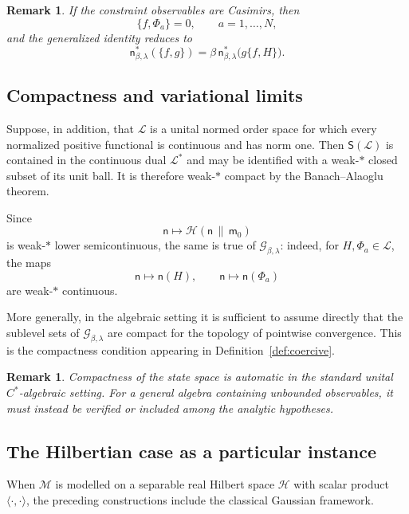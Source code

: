 \documentclass[11pt,reqno]{amsart}
\newtheorem{rem}[Theorem]{Remark}
\begin{document}
\begin{rem}
If the constraint observables are Casimirs, then
\[
\{f,\Phi_a\}=0,
\qquad
a=1,\ldots,N,
\]
and the generalized identity reduces to
\[
\mathsf n_{\beta,\lambda}^*(\{f,g\})
=
\beta\,
\mathsf n_{\beta,\lambda}^*
\bigl(g\{f,H\}\bigr).
\]
\end{rem}

\subsection{Compactness and variational limits}

Suppose, in addition, that $\mathcal L$ is a unital normed order space
for which every normalized positive functional is continuous and has
norm one. Then $\mathsf S(\mathcal L)$ is contained in the continuous
dual $\mathcal L^*$ and may be identified with a weak-$*$ closed subset
of its unit ball. It is therefore weak-$*$ compact by the
Banach--Alaoglu theorem.

Since
\[
\mathsf n\longmapsto
\mathcal H(\mathsf n\,\|\,\mathsf m_0)
\]
is weak-$*$ lower semicontinuous, the same is true of
$\mathcal G_{\beta,\lambda}$: indeed, for
$H,\Phi_a\in\mathcal L$, the maps
\[
\mathsf n\longmapsto\mathsf n(H),
\qquad
\mathsf n\longmapsto\mathsf n(\Phi_a)
\]
are weak-$*$ continuous.

More generally, in the algebraic setting it is sufficient to assume
directly that the sublevel sets of
$\mathcal G_{\beta,\lambda}$ are compact for the topology of pointwise
convergence. This is the compactness condition appearing in
Definition~\ref{def:coercive}.

\begin{rem}
Compactness of the state space is automatic in the standard unital
$C^*$-algebraic setting. For a general algebra containing unbounded
observables, it must instead be verified or included among the analytic
hypotheses.
\end{rem}

\subsection{The Hilbertian case as a particular instance}

When $\mathcal M$ is modelled on a separable real Hilbert space
$\mathscr H$ with scalar product $\langle\cdot,\cdot\rangle$, the
preceding constructions include the classical Gaussian framework.
\end{document}
